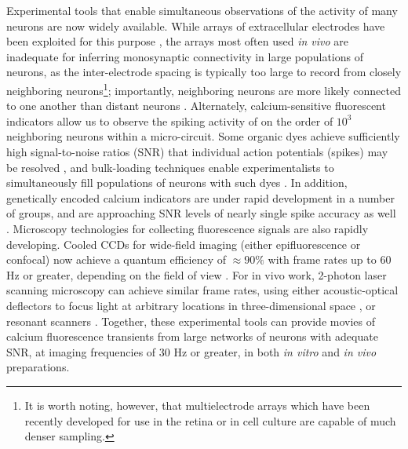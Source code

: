 \documentclass[aoas,preprint]{imsart}
\begin{document}
Experimental tools that enable simultaneous observations of the
activity of many neurons are now widely available. While arrays of
extracellular electrodes have been exploited for this purpose
\cite{HATS98,HARR03,Stein04,Santhanam06,Harris07}, the arrays most
often used \emph{in vivo} are inadequate for inferring monosynaptic
connectivity in large populations of neurons, as the inter-electrode
spacing is typically too large to record from closely neighboring
neurons\footnote{It is worth noting, however, that multielectrode
arrays which have been recently developed for use in the retina
\cite{Berry2004,Litke2004,Petrusca07,PILL07} or in cell culture
\cite{Shepard08} are capable of much denser sampling.}; importantly,
neighboring neurons are more likely connected to one another than
distant neurons \cite{Abeles91,Braitenberg1998}.  Alternately,
calcium-sensitive fluorescent indicators allow us to observe the
spiking activity of on the order of $10^3$ neighboring neurons
\cite{Tsien89,ImagingManual,CAR03,OHKI05} within a micro-circuit.
Some organic dyes achieve sufficiently high signal-to-noise ratios
(SNR) that individual action potentials (spikes) may be resolved
\cite{ImagingManual}, and bulk-loading techniques enable
experimentalists to simultaneously fill populations of neurons with
such dyes \cite{StosiekKonnerth03}. In addition, genetically encoded
calcium indicators are under rapid development in a number of groups,
and are approaching SNR levels of nearly single spike accuracy as well
\cite{WallaceHasan08}. Microscopy technologies for collecting
fluorescence signals are also rapidly developing. Cooled CCDs for
wide-field imaging (either epifluorescence or confocal) now achieve a
quantum efficiency of $\approx 90 \%$ with frame rates up to $60$ Hz
or greater, depending on the field of view \cite{Djurisic04}. For in
vivo work, 2-photon laser scanning microscopy can achieve similar
frame rates, using either acoustic-optical deflectors to focus light
at arbitrary locations in three-dimensional space
\cite{Iyer06,SalomeBourdieu06,ReddySaggau08}, or resonant scanners
\cite{NguyenParker01}. Together, these experimental tools can provide
movies of calcium fluorescence transients from large networks of
neurons with adequate SNR, at imaging frequencies of $30$ Hz or
greater, in both \emph{in vitro} and \emph{in vivo} preparations.
\end{document}
